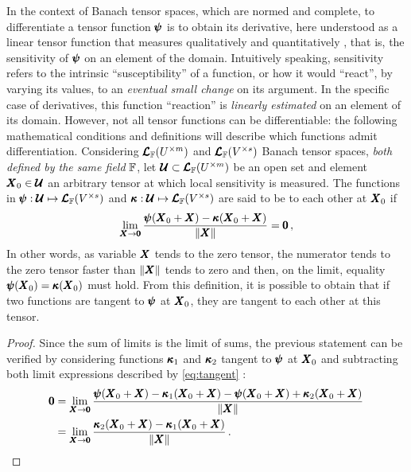 In the context of Banach tensor spaces, which are normed and complete, to differentiate a tensor function $\pmb{\psi}$ is to obtain its derivative, here understood as a linear tensor function that measures qualitatively and quantitatively , that is, the sensitivity of $\pmb{\psi}$ on an element of the domain. Intuitively speaking, sensitivity refers to the intrinsic ``susceptibility'' of a function, or how it would ``react'', by varying its values, to an \emph{eventual small change} on its argument. In the specific case of derivatives, this function ``reaction'' is \emph{linearly estimated} on an element of its domain. However, not all tensor functions can be differentiable: the following mathematical conditions and definitions will describe which functions admit differentiation. Considering $\pmb{\mathcal{L}}_{\mathbb{F}}(U^{\times m})$ and $\pmb{\mathcal{L}}_{\mathbb{F}}(V^{\times s})$ Banach tensor spaces, \emph{both defined by the same field} $\mathbb{F}$, let $\pmb{\mathcal{U}}\subset\pmb{\mathcal{L}}_{\mathbb{F}}(U^{\times m})$ be an open set and element  $\pmb{X}_0\in\pmb{\mathcal{U}}$ an arbitrary tensor at which local sensitivity is measured. The functions in $\pmb{\psi} : \pmb{\mathcal{U}} \mapsto \pmb{\mathcal{L}}_{\mathbb{F}}(V^{\times s})$ and $\pmb{\kappa} : \pmb{\mathcal{U}} \mapsto \pmb{\mathcal{L}}_{\mathbb{F}}(V^{\times s})$ are said to be  to each other at $\pmb{X}_0$ if
\begin{equation}\label{eq:tangent}
\lim_{\pmb{X}\to \pmb{0}} \dfrac{\pmb{\psi}(\pmb{X}_0+\pmb{X})-\pmb{\kappa}(\pmb{X}_0+\pmb{X})}{\|\pmb{X}\|}=\pmb{0}\,,
\end{equation}
In other words, as variable $\pmb{X}$ tends to the zero tensor, the numerator tends to the zero tensor faster than $\|\pmb{X}\|$ tends to zero and then, on the limit, equality $\pmb{\psi}(\pmb{X}_0)=\pmb{\kappa}(\pmb{X}_0)$ must hold. From this definition, it is possible to obtain that if two functions are tangent to $\pmb{\psi}$ at $\pmb{X}_0$, they are tangent to each other at this tensor.

{\footnotesize
\begin{proof}
Since the sum of limits is the limit of sums, the previous statement can be verified by considering functions $\pmb{\kappa}_1$ and $\pmb{\kappa}_2$ tangent to $\pmb{\psi}$ at $\pmb{X}_0$ and subtracting both limit expressions described by \eqref{eq:tangent} :
\begin{align*}
\pmb{0}&=\lim_{\pmb{X}\to \pmb{0}} \dfrac{\pmb{\psi}(\pmb{X}_0+\pmb{X})-\pmb{\kappa}_1(\pmb{X}_0+\pmb{X})-\pmb{\psi}(\pmb{X}_0+\pmb{X})+\pmb{\kappa}_2(\pmb{X}_0+\pmb{X})}{\|\pmb{X}\|}\\
&=\lim_{\pmb{X}\to \pmb{0}} \dfrac{\pmb{\kappa}_2(\pmb{X}_0+\pmb{X})-\pmb{\kappa}_1(\pmb{X}_0+\pmb{X})}{\|\pmb{X}\|}\,.
\end{align*}
\end{proof}}

